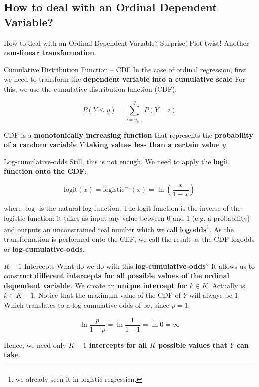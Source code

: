 \subsection{How to deal with an Ordinal Dependent Variable?}
\begin{frame}{How to deal with an Ordinal Dependent Variable?}
	Surprise! Plot twist!
	\vfill
	Another \textbf{non-linear transformation}.
\end{frame}

\begin{frame}{Cumulative Distribution Function -- CDF}
	In the case of ordinal regression,
	first we need to transform the \textbf{dependent variable into a
		cumulative scale}
	\vfill
	For this, we use the cumulative distribution function (CDF):

	$$P(Y \leq y) = \sum^y_{i=y_{\text{min}}} P(Y = i)$$

	CDF is a \textbf{monotonically increasing function} that represents the
	\textbf{probability of a random variable $Y$ taking values less than
		a certain value $y$}
\end{frame}

\begin{frame}{Log-cumulative-odds}
	Still, this is not enough.
	We need to apply the \textbf{logit function onto the CDF}:

	$$\mathrm{logit}(x) = \mathrm{logistic}^{-1}(x) = \ln\left(\frac{x}{1 -x}\right)$$

	where $\log$ is the natural log function.
	\vfill
	The logit function is the inverse of the logistic function:
	it takes as input any value between $0$ and $1$ (e.g. a probability)
	and outputs an unconstrained real number which we call
	\textbf{logodds}\footnote{we already seen it in logistic regression.}.
	\vfill
	As the transformation is performed onto the CDF,
	we call the result as the CDF logodds or \textbf{log-cumulative-odds}.
\end{frame}

\begin{frame}{$K-1$ Intercepts}
	What do we do with this \textbf{log-cumulative-odds}?
	\vfill
	It allows us to construct \textbf{different intercepts for all possible
		values of the ordinal dependent variable}.
	We create an \textbf{unique intercept for $k \in K$}.
	\vfill
	Actually is $k \in K-1$.
	Notice that the maximum value of the CDF of $Y$ will always be $1$.
	Which translates to a log-cumulative-odds of $\infty$,
	since $p=1$:

	$$\ln \frac{p}{1-p} = \ln \frac{1}{1-1} = \ln 0 = \infty$$

	Hence, we need only \textbf{$K-1$ intercepts for all $K$ possible
		values that $Y$ can take}.
\end{frame}

